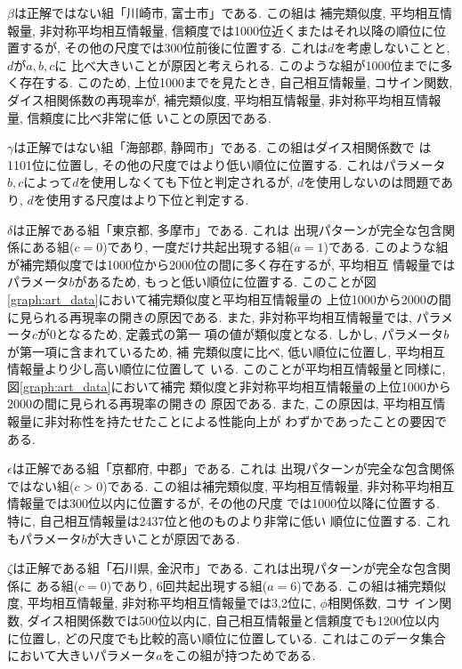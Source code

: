 $\beta$は正解ではない組「川崎市, 富士市」である. この組は
補完類似度, 平均相互情報量, 非対称平均相互情報量, 信頼度では1000位近くまたはそれ以降の順位に位置するが, 
その他の尺度では300位前後に位置する. これは$d$を考慮しないことと, $d$が$a,b,c$に
比べ大きいことが原因と考えられる. 
このような組が1000位までに多く存在する. このため, 上位1000までを見たとき, 
自己相互情報量, コサイン関数, 
ダイス相関係数の再現率が, 補完類似度, 平均相互情報量, 非対称平均相互情報量, 信頼度に比べ非常に低
いことの原因である. 

$\gamma$は正解ではない組「海部郡, 静岡市」である. この組はダイス相関係数で
は1101位に位置し, その他の尺度ではより低い順位に位置する. 
これはパラメータ$b,c$によって$d$を使用しなくても下位と判定されるが, 
$d$を使用しないのは問題であり, $d$を使用する尺度はより下位と判定する. 

$\delta$は正解である組「東京都, 多摩市」である. これは
出現パターンが完全な包含関係にある組($c=0$)であり, 
一度だけ共起出現する組($a=1$)である. 
このような組が補完類似度では1000位から2000位の間に多く存在するが, 平均相互
情報量ではパラメータ$b$があるため, もっと低い順位に位置する. 
このことが図\ref{graph:art_data}において補完類似度と平均相互情報量の
上位1000から2000の間に見られる再現率の開きの原因である. 
また, 非対称平均相互情報量では, パラメータ$c$が$0$となるため, 定義式の第一
項の値が類似度となる. しかし, パラメータ$b$が第一項に含まれているため, 補
完類似度に比べ, 低い順位に位置し, 平均相互情報量より少し高い順位に位置して
いる. 
このことが平均相互情報量と同様に, 図\ref{graph:art_data}において補完
類似度と非対称平均相互情報量の上位1000から2000の間に見られる再現率の開きの
原因である. 
また, この原因は, 平均相互情報量に非対称性を持たせたことによる性能向上が
わずかであったことの要因である. 

$\epsilon$は正解である組「京都府, 中郡」である. これは
出現パターンが完全な包含関係ではない組($c>0$)である. 
この組は補完類似度, 平均相互情報量, 非対称平均相互情報量では300位以内に位置するが, その他の尺度
では1000位以降に位置する. 特に, 自己相互情報量は2437位と他のものより非常に低い
順位に位置する. 
これもパラメータ$b$が大きいことが原因である. 

$\zeta$は正解である組「石川県, 金沢市」である. これは出現パターンが完全な包含関係に
ある組($c=0$)であり, 6回共起出現する組($a=6$)である. 
この組は補完類似度, 平均相互情報量, 非対称平均相互情報量では3,2位に, $\phi$相関係数, コサ
イン関数, ダイス相関係数では500位以内に, 自己相互情報量と信頼度でも1200位以内
に位置し, どの尺度でも比較的高い順位に位置している. 
これはこのデータ集合において大きいパラメータ$a$をこの組が持つためである. 

